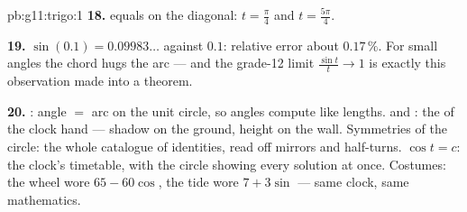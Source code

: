 \begin{solution}{pb:g11:trigo:1}
\textbf{18.}  equals  on the diagonal:
$t = \frac\pi4$ and $t = \frac{5\pi}{4}$.

\textbf{19.} $\sin(0.1) = 0.09983\ldots$ against $0.1$:
relative error about $0.17\,\%$. For small angles the chord
hugs the arc --- and the grade-12 limit
$\frac{\sin t}{t} \to 1$ is exactly this observation made into
a theorem.

\textbf{20.} : angle $=$ arc on the unit circle, so
angles compute like lengths.  and : the 
of the clock hand --- shadow on the ground, height on the
wall. Symmetries of the circle: the whole catalogue of
identities, read off mirrors and half-turns. 
$\cos t = c$: the clock's timetable, with the circle showing
every solution at once. Costumes: the wheel wore
$65 - 60\cos$, the tide wore $7 + 3\sin$ --- same clock, same
mathematics.
\end{solution}
